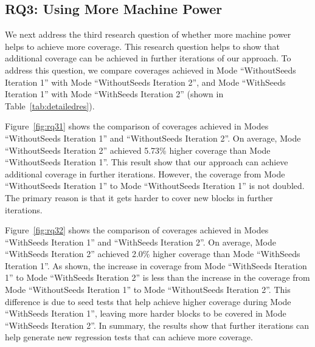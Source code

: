 
\subsection{RQ3: Using More Machine Power}

We next address the third research question of whether more machine power helps to achieve more coverage. This research question helps to show that additional coverage can be achieved in further iterations of our approach. To address this question, we compare coverages achieved in Mode ``WithoutSeeds Iteration 1'' with Mode ``WithoutSeeds Iteration 2'', and Mode ``WithSeeds Iteration 1'' with Mode ``WithSeeds Iteration 2'' (shown in Table~\ref{tab:detailedres}). 

Figure~\ref{fig:rq31} shows the comparison of coverages achieved in Modes ``WithoutSeeds Iteration 1'' and ``WithoutSeeds Iteration 2''. On average, Mode ``WithoutSeeds Iteration 2'' achieved 5.73\% higher coverage than Mode ``WithoutSeeds Iteration 1''. This result show that our approach can achieve additional coverage in further iterations. However, the coverage from Mode ``WithoutSeeds Iteration 1'' to Mode ``WithoutSeeds Iteration 1'' is not doubled. The primary reason is that it gets harder to cover new blocks in further iterations.

Figure~\ref{fig:rq32} shows the comparison of coverages achieved in Modes ``WithSeeds Iteration 1'' and ``WithSeeds Iteration 2''. On average, Mode ``WithSeeds Iteration 2'' achieved 2.0\% higher coverage than Mode ``WithSeeds Iteration 1''. As shown, the increase in coverage from Mode ``WithSeeds Iteration 1'' to Mode ``WithSeeds Iteration 2'' is less than the increase in the coverage from Mode ``WithoutSeeds Iteration 1'' to Mode ``WithoutSeeds Iteration 2''. This difference is due to seed tests that help achieve higher coverage during Mode ``WithSeeds Iteration 1'', leaving more harder blocks to be covered in Mode ``WithSeeds Iteration 2''. In summary, the results show that further iterations can help generate new regression tests that can achieve more coverage.

